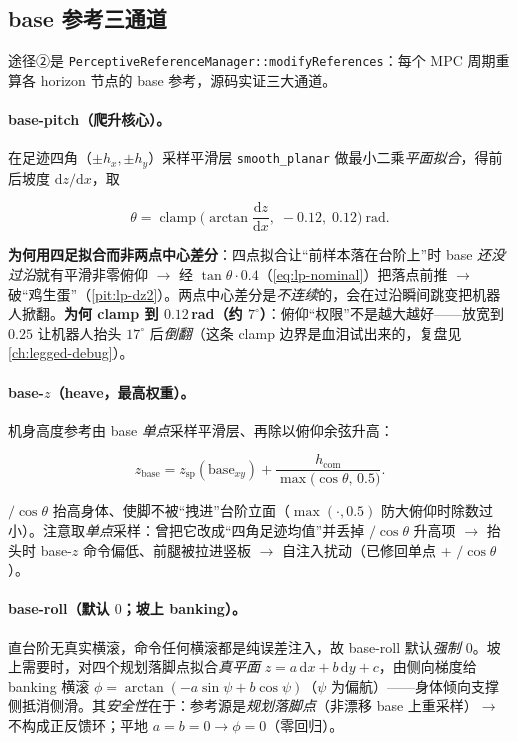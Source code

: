 \subsection{base 参考三通道}
\label{subsec:lp-baseref}

途径②是 \texttt{PerceptiveReferenceManager::modifyReferences}：每个 MPC 周期重算各 horizon 节点的 base 参考，源码实证三大通道。

\paragraph{base-pitch（爬升核心）。}
在足迹四角（$\pm h_x,\pm h_y$）采样平滑层 \texttt{smooth\_planar} 做最小二乘\emph{平面拟合}，得前后坡度 $\mathrm{d}z/\mathrm{d}x$，取

\begin{equation}
  \theta = \operatorname{clamp}\!\Big(\arctan\frac{\mathrm{d}z}{\mathrm{d}x},\; -0.12,\; 0.12\Big)\ \text{rad}.
  \label{eq:lp-pitch}
\end{equation}

\textbf{为何用四足拟合而非两点中心差分}：四点拟合让“前样本落在台阶上”时 base \emph{还没过沿}就有平滑非零俯仰 $\to$ 经 $\tan\theta\cdot 0.4$（\cref{eq:lp-nominal}）把落点前推 $\to$ 破“鸡生蛋”（\cref{pit:lp-dz2}）。两点中心差分是\emph{不连续}的，会在过沿瞬间跳变把机器人掀翻。\textbf{为何 clamp 到 $0.12\,$rad（约 $7^\circ$）}：俯仰“权限”不是越大越好——放宽到 $0.25$ 让机器人抬头 $17^\circ$ 后\emph{倒翻}（这条 clamp 边界是血泪试出来的，复盘见 \cref{ch:legged-debug}）。

\paragraph{base-$z$（heave，最高权重）。}
机身高度参考由 base \emph{单点}采样平滑层、再除以俯仰余弦升高：

\begin{equation}
  z_{\mathrm{base}} = z_{\mathrm{sp}}(\text{base}_{xy}) + \frac{h_{\mathrm{com}}}{\max\!\big(\cos\theta,\,0.5\big)}.
  \label{eq:lp-basez}
\end{equation}

$/\cos\theta$ 抬高身体、使脚不被“拽进”台阶立面（$\max(\cdot,0.5)$ 防大俯仰时除数过小）。注意取\emph{单点}采样：曾把它改成“四角足迹均值”并丢掉 $/\cos\theta$ 升高项 $\to$ 抬头时 base-$z$ 命令偏低、前腿被拉进竖板 $\to$ 自注入扰动（已修回单点 + $/\cos\theta$）。

\paragraph{base-roll（默认 $0$；坡上 banking）。}
直台阶无真实横滚，命令任何横滚都是纯误差注入，故 base-roll 默认\emph{强制 $0$}。坡上需要时，对四个规划落脚点拟合\emph{真平面} $z=a\,\mathrm{d}x+b\,\mathrm{d}y+c$，由侧向梯度给 banking 横滚 $\phi=\arctan(-a\sin\psi+b\cos\psi)$（$\psi$ 为偏航）——身体倾向支撑侧抵消侧滑。其\emph{安全性}在于：参考源是\emph{规划落脚点}（非漂移 base 上重采样）$\to$ 不构成正反馈环；平地 $a=b=0\to\phi=0$（零回归）。

